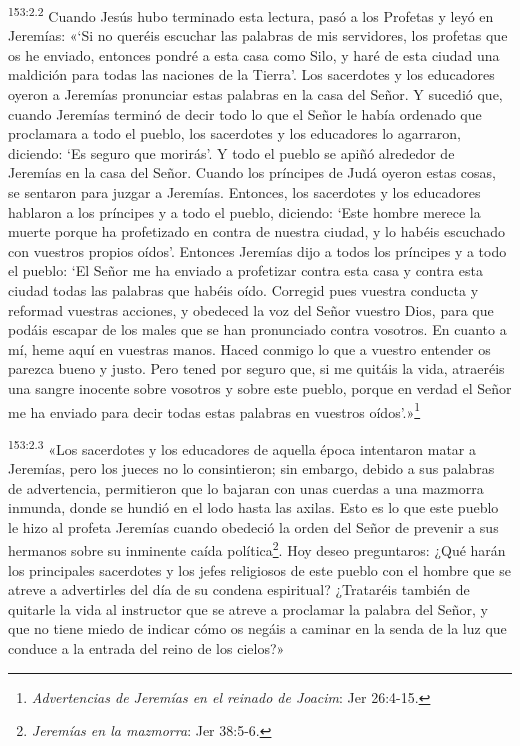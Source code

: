 \par 
\textsuperscript{153:2.2} Cuando Jesús hubo terminado esta lectura, pasó a los Profetas y leyó en Jeremías: «`Si no queréis escuchar las palabras de mis servidores, los profetas que os he enviado, entonces pondré a esta casa como Silo, y haré de esta ciudad una maldición para todas las naciones de la Tierra'. Los sacerdotes y los educadores oyeron a Jeremías pronunciar estas palabras en la casa del Señor. Y sucedió que, cuando Jeremías terminó de decir todo lo que el Señor le había ordenado que proclamara a todo el pueblo, los sacerdotes y los educadores lo agarraron, diciendo: `Es seguro que morirás'. Y todo el pueblo se apiñó alrededor de Jeremías en la casa del Señor. Cuando los príncipes de Judá oyeron estas cosas, se sentaron para juzgar a Jeremías. Entonces, los sacerdotes y los educadores hablaron a los príncipes y a todo el pueblo, diciendo: `Este hombre merece la muerte porque ha profetizado en contra de nuestra ciudad, y lo habéis escuchado con vuestros propios oídos'. Entonces Jeremías dijo a todos los príncipes y a todo el pueblo: `El Señor me ha enviado a profetizar contra esta casa y contra esta ciudad todas las palabras que habéis oído. Corregid pues vuestra conducta y reformad vuestras acciones, y obedeced la voz del Señor vuestro Dios, para que podáis escapar de los males que se han pronunciado contra vosotros. En cuanto a mí, heme aquí en vuestras manos. Haced conmigo lo que a vuestro entender os parezca bueno y justo. Pero tened por seguro que, si me quitáis la vida, atraeréis una sangre inocente sobre vosotros y sobre este pueblo, porque en verdad el Señor me ha enviado para decir todas estas palabras en vuestros oídos'.»\footnote{\textit{Advertencias de Jeremías en el reinado de Joacim}: Jer 26:4-15.}

\par 
\textsuperscript{153:2.3} «Los sacerdotes y los educadores de aquella época intentaron matar a Jeremías, pero los jueces no lo consintieron; sin embargo, debido a sus palabras de advertencia, permitieron que lo bajaran con unas cuerdas a una mazmorra inmunda, donde se hundió en el lodo hasta las axilas. Esto es lo que este pueblo le hizo al profeta Jeremías cuando obedeció la orden del Señor de prevenir a sus hermanos sobre su inminente caída política\footnote{\textit{Jeremías en la mazmorra}: Jer 38:5-6.}. Hoy deseo preguntaros: ¿Qué harán los principales sacerdotes y los jefes religiosos de este pueblo con el hombre que se atreve a advertirles del día de su condena espiritual? ¿Trataréis también de quitarle la vida al instructor que se atreve a proclamar la palabra del Señor, y que no tiene miedo de indicar cómo os negáis a caminar en la senda de la luz que conduce a la entrada del reino de los cielos?»

